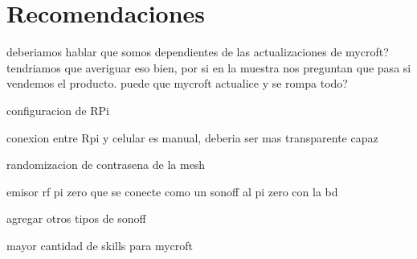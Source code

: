 \chapter{Recomendaciones}

deberiamos hablar que somos dependientes de las actualizaciones de mycroft? tendriamos que averiguar eso bien, por si en la muestra nos preguntan que pasa si vendemos el producto. puede que mycroft actualice y se rompa todo?

configuracion de RPi 

conexion entre Rpi y celular es manual, deberia ser mas transparente capaz

randomizacion de contrasena de la mesh

emisor rf pi zero que se conecte como un sonoff al pi zero con la bd

agregar otros tipos de sonoff

mayor cantidad de skills para mycroft
